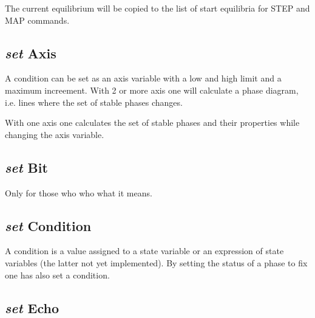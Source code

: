 \documentclass[12pt]{article}
\begin{document}
The current equilibrium will be copied to the list of start equilibria
for STEP and MAP commands.

\subsection{{\em set} Axis}

A condition can be set as an axis variable with a low and high limit
and a maximum increement.  With 2 or more axis one will calculate a
phase diagram, i.e. lines where the set of stable phases changes.

With one axis one calculates the set of stable phases and their
properties while changing the axis variable.

\subsection{{\em set} Bit}

Only for those who who what it means.

\subsection{{\em set} Condition}

A condition is a value assigned to a state variable or an expression
of state variables (the latter not yet implemented).  By setting the
status of a phase to fix one has also set a condition.

\subsection{{\em set} Echo}
\end{document}
